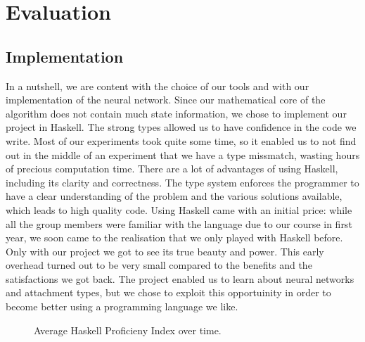 \chapter{Evaluation}




\section{Implementation}


In a nutshell, we are content with the choice of our tools and with our implementation of the neural network. Since our mathematical core of the algorithm does not contain much state information, we chose to implement our project in Haskell.
The strong types allowed us to have confidence in the code we write. Most of our experiments took quite some time, so it enabled us to not find out in the middle of an experiment that we have a type missmatch, wasting hours of precious computation time.
There are a lot of advantages of using Haskell, including its clarity and correctness. The type system enforces the programmer to have a clear understanding of the problem and the various solutions available, which leads to high quality code.
Using Haskell came with an initial price: while all the group members were familiar with the language due to our course in first year, we soon came to the realisation that we only played with Haskell before. Only with our project we got to see its true beauty and power.
This early overhead turned out to be very small compared to the benefits and the satisfactions we got back. The project enabled us to learn about neural networks and attachment types, but we chose to exploit this opportuinity in order to become better using a programming language we like.
\begin{figure}[h]

\caption{Average Haskell Proficieny Index over time.}
\label{fig:Haskell Proficieny Index over time}
\end{figure}

